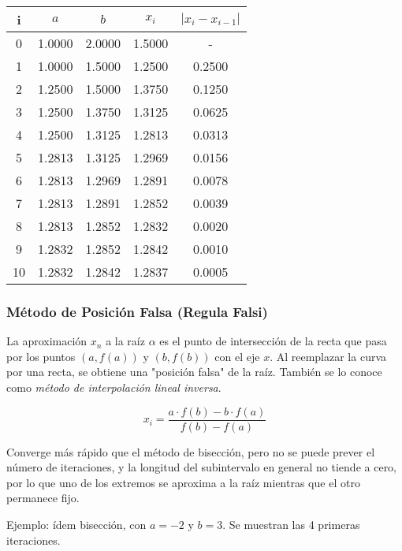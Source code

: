 \documentclass{article}
\begin{document}
\begin{table}[h]
\centering
\begin{tabular}{ccccc}
    i & $a$    & $b$    & $x_i$  & $|x_i - x_{i-1}|$ \\\hline
    0 & 1.0000 & 2.0000 & 1.5000 & -                 \\
    1 & 1.0000 & 1.5000 & 1.2500 & 0.2500            \\
    2 & 1.2500 & 1.5000 & 1.3750 & 0.1250            \\
    3 & 1.2500 & 1.3750 & 1.3125 & 0.0625            \\
    4 & 1.2500 & 1.3125 & 1.2813 & 0.0313            \\
    5 & 1.2813 & 1.3125 & 1.2969 & 0.0156            \\
    6 & 1.2813 & 1.2969 & 1.2891 & 0.0078            \\
    7 & 1.2813 & 1.2891 & 1.2852 & 0.0039            \\
    8 & 1.2813 & 1.2852 & 1.2832 & 0.0020            \\
    9 & 1.2832 & 1.2852 & 1.2842 & 0.0010            \\
   10 & 1.2832 & 1.2842 & 1.2837 & 0.0005
\end{tabular}
\end{table}

\subsubsection{Método de Posición Falsa (Regula Falsi)}

La aproximación $x_n$ a la raíz $\alpha$ es el punto de intersección de la recta
que pasa por los puntos $(a, f(a))$ y $(b, f(b))$ con el eje $x$. Al reemplazar
la curva por una recta, se obtiene una "posición falsa" de la raíz. También se
lo conoce como \textit{método de interpolación lineal inversa}.

\begin{equation*}
    x_i = \frac{a\cdot f(b) - b\cdot f(a)}{f(b) - f(a)}
\end{equation*}

Converge más rápido que el método de bisección, pero no se puede prever el 
número de iteraciones, y la longitud del subintervalo en general no tiende a 
cero, por lo que uno de los extremos se aproxima a la raíz mientras que el otro
permanece fijo.

Ejemplo: ídem bisección, con $a=-2$ y $b=3$. Se muestran las 4 primeras
iteraciones.
\end{document}
